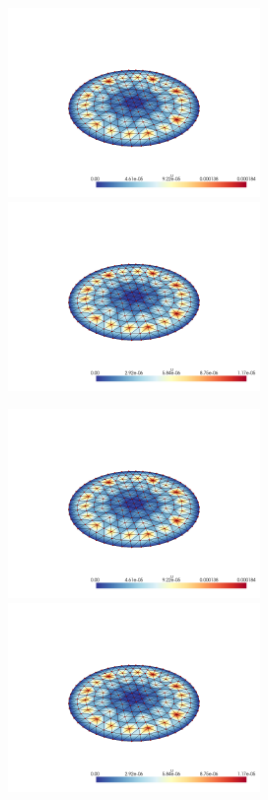 \documentclass[
  11pt,
]{article}
\let\origfigure\figure
\let\endorigfigure\endfigure
\renewenvironment{figure}[1][2] {
    \expandafter\origfigure\expandafter[H]
} {
    \endorigfigure
}
\begin{document}
\begin{figure}
\caption{Finite element error in the L2 and H1 norms/seminorms, respectively for problem 1 over mesh number 2 using order 8 quadrature.}
\end{figure}

\includegraphics[width=0.5\textwidth,height=\textheight]{../img/mesh2-gauss13-b-L2.png}
\includegraphics[width=0.5\textwidth,height=\textheight]{../img/mesh2-gauss13-b-H1.png}

\begin{figure}
\caption{Finite element error in the L2 and H1 norms/seminorms, respectively for problem 1 over mesh number 2 using order 13 quadrature.}
\end{figure}

\includegraphics[width=0.5\textwidth,height=\textheight]{../img/mesh2-gauss19-b-L2.png}
\includegraphics[width=0.5\textwidth,height=\textheight]{../img/mesh2-gauss19-b-H1.png}
\end{document}
